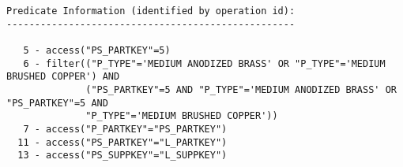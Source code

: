 \documentclass[11pt,a4paper,parskip=half]{scrartcl}
\begin{document}
\begin{lstlisting}
Predicate Information (identified by operation id):                                                                                                                                                                                                                                                          
---------------------------------------------------                                                                                                                                                                                                                                                          
                                                                                                                                                                                                                                                                                                             
   5 - access("PS_PARTKEY"=5)                                                                                                                                                                                                                                                                                
   6 - filter(("P_TYPE"='MEDIUM ANODIZED BRASS' OR "P_TYPE"='MEDIUM BRUSHED COPPER') AND                                                                                                                                                                                                                     
              ("PS_PARTKEY"=5 AND "P_TYPE"='MEDIUM ANODIZED BRASS' OR "PS_PARTKEY"=5 AND                                                                                                                                                                                                                     
              "P_TYPE"='MEDIUM BRUSHED COPPER'))                                                                                                                                                                                                                                                             
   7 - access("P_PARTKEY"="PS_PARTKEY")                                                                                                                                                                                                                                                                      
  11 - access("PS_PARTKEY"="L_PARTKEY")                                                                                                                                                                                                                                                                      
  13 - access("PS_SUPPKEY"="L_SUPPKEY")                                                                                                                                                                                                                                                                      
\end{lstlisting}
\end{document}
